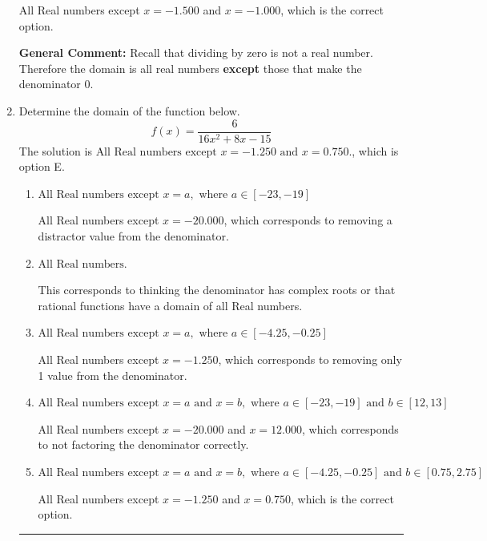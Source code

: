 \documentclass{extbook}[14pt]
\newcommand{\litem}[1]{\item #1

\rule{\textwidth}{0.4pt}}
\begin{document}
\begin{enumerate}
{\begin{enumerate}[label=\Alph*.]
All Real numbers except $x = -1.500$ and $x = -1.000$, which is the correct option.
\end{enumerate}

\textbf{General Comment:} Recall that dividing by zero is not a real number. Therefore the domain is all real numbers \textbf{except} those that make the denominator 0.
}
\litem{
Determine the domain of the function below.
\[ f(x) = \frac{6}{16x^{2} +8 x -15} \]The solution is \( \text{All Real numbers except } x = -1.250 \text{ and } x = 0.750. \), which is option E.\begin{enumerate}[label=\Alph*.]
\item \( \text{All Real numbers except } x = a, \text{ where } a \in [-23, -19] \)

All Real numbers except $x = -20.000$, which corresponds to removing a distractor value from the denominator.
\item \( \text{All Real numbers.} \)

This corresponds to thinking the denominator has complex roots or that rational functions have a domain of all Real numbers.
\item \( \text{All Real numbers except } x = a, \text{ where } a \in [-4.25, -0.25] \)

All Real numbers except $x = -1.250$, which corresponds to removing only 1 value from the denominator.
\item \( \text{All Real numbers except } x = a \text{ and } x = b, \text{ where } a \in [-23, -19] \text{ and } b \in [12, 13] \)

All Real numbers except $x = -20.000$ and $x = 12.000$, which corresponds to not factoring the denominator correctly.
\item \( \text{All Real numbers except } x = a \text{ and } x = b, \text{ where } a \in [-4.25, -0.25] \text{ and } b \in [0.75, 2.75] \)

All Real numbers except $x = -1.250$ and $x = 0.750$, which is the correct option.
\end{enumerate}

}
\end{enumerate}
\end{document}
